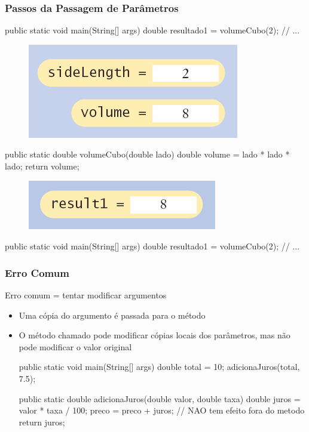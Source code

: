 \documentclass[xcolor={dvipsnames,table},aspectratio=169]{beamer}
\begin{document}
\begin{frame}[fragile]\frametitle{Passos da Passagem de Parâmetros}
{\tiny
\begin{javacode}
public static void main(String[] args) {
  double resultado1 = volumeCubo(2);
  // ...
}
\end{javacode}
\begin{figure}[h]
	\includegraphics[height=0.12\paperheight,center]{pucrs-ep-fprog-unidade_05-metodos-laminas-passo_passagem_de_parametros_1.png}
\end{figure}
\begin{javacode}
public static double volumeCubo(double lado) {
   double volume = lado * lado * lado;
   return volume;
}
\end{javacode}
\begin{figure}[h]
	\includegraphics[height=0.08\paperheight,center]{pucrs-ep-fprog-unidade_05-metodos-laminas-passo_passagem_de_parametros_2.png}
\end{figure}
\begin{javacode}
public static void main(String[] args) {
  double resultado1 = volumeCubo(2);
  // ...
}
\end{javacode}
}
\end{frame}

\begin{frame}[fragile]\frametitle{Erro Comum}
Erro comum = tentar modificar argumentos
\begin{itemize}
	\item Uma cópia do argumento é passada para o método
	\item O método chamado pode modificar cópias locais dos parâmetros, mas não pode modificar o valor original
{\small
\begin{javacode}
public static void main(String[] args) {
  double total = 10;
  adicionaJuros(total, 7.5); 
}

public static double adicionaJuros(double valor, double taxa) {
  double juros = valor * taxa / 100;
  preco = preco + juros; // NAO tem efeito fora do metodo
  return juros;
}
\end{javacode}
}
\end{itemize}
\end{frame}
\end{document}
